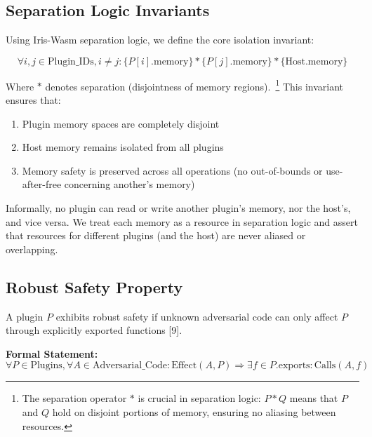 \subsection{Separation Logic Invariants}

Using Iris-Wasm separation logic, we define the core isolation invariant:

\begin{equation}
\forall i, j \in \text{Plugin\_IDs}, i \neq j: \{P[i].\text{memory}\} * \{P[j].\text{memory}\} * \{\text{Host}.\text{memory}\}
\end{equation}

Where $*$ denotes separation (disjointness of memory regions).~\footnote{The separation operator $*$ is crucial in separation logic: $P * Q$ means that $P$ and $Q$ hold on disjoint portions of memory, ensuring no aliasing between resources.} This invariant ensures that:

\begin{enumerate}
\item Plugin memory spaces are completely disjoint
\item Host memory remains isolated from all plugins
\item Memory safety is preserved across all operations (no out-of-bounds or use-after-free concerning another's memory)
\end{enumerate}

Informally, no plugin can read or write another plugin's memory, nor the host's, and vice versa. We treat each memory as a resource in separation logic and assert that resources for different plugins (and the host) are never aliased or overlapping.

\subsection{Robust Safety Property}

\begin{definition}
A plugin $P$ exhibits robust safety if unknown adversarial code can only affect $P$ through explicitly exported functions [9].
\end{definition}

\textbf{Formal Statement:}
\begin{equation}
\forall P \in \text{Plugins}, \forall A \in \text{Adversarial\_Code}: \text{Effect}(A, P) \Rightarrow \exists f \in P.\text{exports}: \text{Calls}(A, f)
\end{equation}

